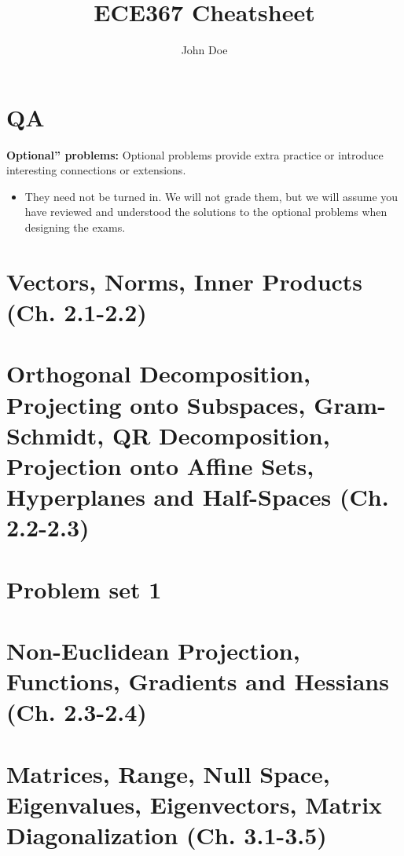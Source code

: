 \documentclass{article}
\title{ECE367 Cheatsheet}
\author{John Doe}
\begin{document}
\maketitle

\tableofcontents

\listoffigures

\listoftables

\section{QA}
\begin{intuition}
    \textbf{Optional” problems:} Optional problems provide extra practice or introduce interesting connections or extensions. 
    \begin{itemize}
        \item They need not be turned in. We will not grade them, but we will assume you have reviewed and understood the solutions to the optional problems when designing the exams. 
    \end{itemize}
\end{intuition}

\section{Vectors, Norms, Inner Products (Ch. 2.1-2.2)}

\newpage

\section{Orthogonal Decomposition, Projecting onto Subspaces, Gram-Schmidt, QR Decomposition, Projection onto Affine Sets, Hyperplanes and Half-Spaces (Ch. 2.2-2.3)}

\newpage

\section{Problem set 1}

\newpage

\section{Non-Euclidean Projection, Functions, Gradients and Hessians (Ch. 2.3-2.4)}

\newpage

\section{Matrices, Range, Null Space, Eigenvalues, Eigenvectors, Matrix Diagonalization (Ch. 3.1-3.5)}

\newpage
\end{document}
